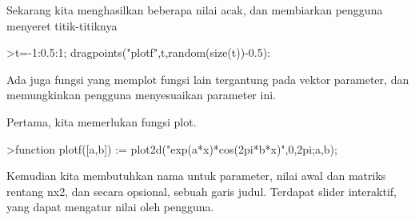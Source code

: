 \documentclass[12pt,Times new roman,letterpaper]{book}
\begin{document}
\begin{eulernootebook}
\begin{eulercomment}
\begin{eulercomment}
\begin{eulernootebook}
\begin{eulercomment}
\begin{eulercomment}
\begin{eulercomment}
\begin{eulercomment}
\begin{eulercomment}
\begin{eulercomment}
\begin{eulercomment}
\begin{eulernotebook}
\begin{eulercomment}
\begin{eulercomment}
\begin{eulercomment}
\begin{eulercomment}
\begin{eulercomment}
Sekarang kita menghasilkan beberapa nilai acak, dan membiarkan
pengguna menyeret titik-titiknya
\end{eulercomment}
\begin{eulerprompt}
>t=-1:0.5:1; dragpoints("plotf",t,random(size(t))-0.5):
\end{eulerprompt}
\begin{eulercomment}
Ada juga fungsi yang memplot fungsi lain tergantung pada vektor
parameter, dan memungkinkan pengguna menyesuaikan parameter ini.

Pertama, kita memerlukan fungsi plot.
\end{eulercomment}
\begin{eulerprompt}
>function plotf([a,b]) := plot2d("exp(a*x)*cos(2pi*b*x)",0,2pi;a,b);
\end{eulerprompt}
\begin{eulercomment}
Kemudian kita membutuhkan nama untuk parameter, nilai awal dan matriks
rentang nx2, dan secara opsional, sebuah garis judul. Terdapat slider
interaktif, yang dapat mengatur nilai oleh pengguna. 


\end{eulercomment}
\end{eulercomment}
\end{eulercomment}
\end{eulercomment}
\end{eulercomment}
\end{eulernotebook}
\end{eulercomment}
\end{eulercomment}
\end{eulercomment}
\end{eulercomment}
\end{eulercomment}
\end{eulercomment}
\end{eulercomment}
\end{eulernootebook}
\end{eulercomment}
\end{eulercomment}
\end{eulernootebook}
\end{document}
